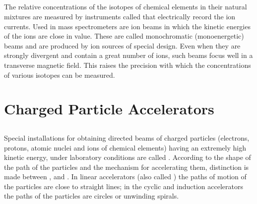 \subsection{}\label{24.3.4} The relative concentrations of the isotopes of chemical elements in their natural mixtures are measured by instruments called  that electrically record the ion currents. Used in mass spectrometers are ion beams in which the kinetic energies of the ions are close in value. These are called mono­chromatic (monoenergetic) beams and are produced by ion sources of special design. Even when they are strongly divergent and contain a great number of ions, such beams focus well in a transverse magnetic field. This raises the precision with which the concentrations of various isotopes can be measured.

\section{Charged Particle Accelerators}
\label{sec-24.4}

\subsection{}\label{24.4.1} Special installations for obtaining directed beams of charged particles (electrons, protons, atomic nuclei and ions of chemical elements) having an extremely high kinetic energy, under laboratory conditions are called . According to the shape of the path of the particles and the mechanism for accelerating them, distinction is made between ,  and . In linear accelerators (also called ) the paths of motion of the particles are close to straight lines; in the cyclic and induction accelerators the paths of the particles are circles or unwinding spirals.

